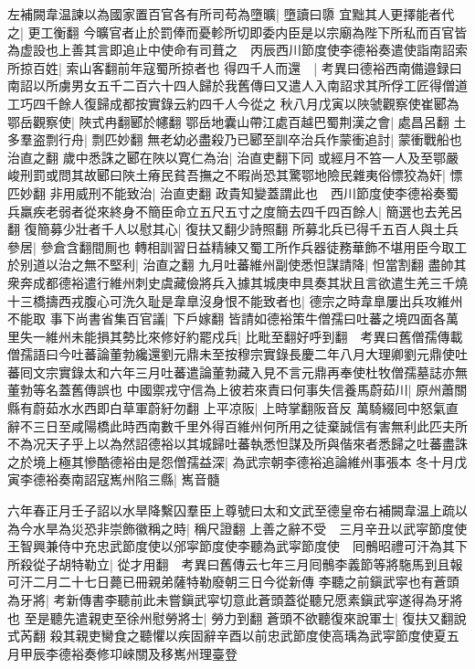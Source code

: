 左補闕韋温諫以為國家置百官各有所司苟為墮曠|{
	墮讀曰隳}
宜黜其人更擇能者代之|{
	更工衡翻}
今曠官者止於罰俸而憂軫所切即委内臣是以宗廟為陛下所私而百官皆為虚設也上善其言即追止中使命有司葺之　丙辰西川節度使李德裕奏遣使詣南詔索所掠百姓|{
	索山客翻前年寇蜀所掠者也}
得四千人而還　|{
	考異曰德裕西南備邉録曰南詔以所虜男女五千二百六十四人歸於我舊傳曰又遣人入南詔求其所俘工匠得僧道工巧四千餘人復歸成都按實錄云約四千人今從之}
秋八月戊寅以陜虢觀察使崔郾為鄂岳觀察使|{
	陜式冉翻郾於幰翻}
鄂岳地囊山帶江處百越巴蜀荆漢之會|{
	處昌呂翻}
土多羣盗剽行舟|{
	剽匹妙翻}
無老幼必盡殺乃已郾至訓卒治兵作蒙衝追討|{
	蒙衝戰船也治直之翻}
歲中悉誅之郾在陜以寛仁為治|{
	治直吏翻下同}
或經月不笞一人及至鄂嚴峻刑罰或問其故郾曰陜土瘠民貧吾撫之不暇尚恐其驚鄂地險民雜夷俗慓狡為奸|{
	慓匹妙翻}
非用威刑不能致治|{
	治直吏翻}
政貴知變蓋謂此也　西川節度使李德裕奏蜀兵羸疾老弱者從來終身不簡臣命立五尺五寸之度簡去四千四百餘人|{
	簡選也去羌呂翻}
復簡募少壯者千人以慰其心|{
	復扶又翻少詩照翻}
所募北兵已得千五百人與土兵參居|{
	參倉含翻間厠也}
轉相訓習日益精練又蜀工所作兵器徒務華飾不堪用臣今取工於别道以治之無不堅利|{
	治直之翻}
九月吐蕃維州副使悉怛謀請降|{
	怛當割翻}
盡帥其衆奔成都德裕遣行維州刺史虞藏儉將兵入據其城庚申具奏其狀且言欲遣生羌三千燒十三橋擣西戎腹心可洗久耻是韋臯沒身恨不能致者也|{
	德宗之時韋臯屢出兵攻維州不能取}
事下尚書省集百官議|{
	下戶嫁翻}
皆請如德裕策牛僧孺曰吐蕃之境四面各萬里失一維州未能損其勢比來修好約罷戍兵|{
	比毗至翻好呼到翻　考異曰舊僧孺傳載僧孺語曰今吐蕃論董勃纔還劉元鼎未至按穆宗實錄長慶二年八月大理卿劉元鼎使吐蕃囘文宗實錄太和六年三月吐蕃遣論董勃藏入見不言元鼎再奉使杜牧僧孺墓誌亦無董勃等名蓋舊傳誤也}
中國禦戎守信為上彼若來責曰何事失信養馬蔚茹川|{
	原州蕭關縣有蔚茹水水西即白草軍蔚紆勿翻}
上平凉阪|{
	上時掌翻阪音反}
萬騎綴囘中怒氣直辭不三日至咸陽橋此時西南數千里外得百維州何所用之徒棄誠信有害無利此匹夫所不為况天子乎上以為然詔德裕以其城歸吐蕃執悉怛謀及所與偕來者悉歸之吐蕃盡誅之於境上極其慘酷德裕由是怨僧孺益深|{
	為武宗朝李德裕追論維州事張本}
冬十月戊寅李德裕奏南詔寇嶲州陷三縣|{
	嶲音髓}


六年春正月壬子詔以水旱降繫囚羣臣上尊號曰太和文武至德皇帝右補闕韋温上疏以為今水旱為災恐非崇飾徽稱之時|{
	稱尺證翻}
上善之辭不受　三月辛丑以武寜節度使王智興兼侍中充忠武節度使以邠寜節度使李聽為武寜節度使　囘鶻昭禮可汗為其下所殺從子胡特勒立|{
	從才用翻　考異曰舊傳云七年三月囘鶻李義節等將駞馬到且報可汗二月二十七日薨已冊親弟薩特勒廢朝三日今從新傳}
李聽之前鎭武寜也有蒼頭為牙將|{
	考新傳書李聽前此未嘗鎭武寜切意此蒼頭蓋從聽兄愿素鎭武寜遂得為牙將也}
至是聽先遣親吏至徐州慰勞將士|{
	勞力到翻}
蒼頭不欲聽復來說軍士|{
	復扶又翻說式芮翻}
殺其親吏臠食之聽懼以疾固辭辛酉以前忠武節度使高瑀為武寜節度使夏五月甲辰李德裕奏修卭崍關及移嶲州理臺登

